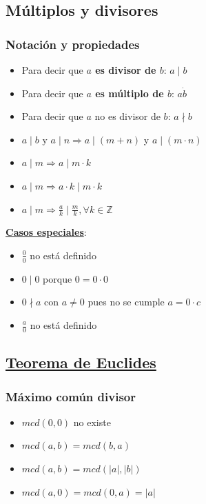 \documentclass[10pt,a4paper,openright]{book}
\begin{document}
\subsection*{Múltiplos y divisores}
\subsubsection*{Notación y propiedades}
\begin{itemize}
\item Para decir que \textbf{$a$ es divisor de $b$}: $a\mid b$
\item Para decir que \textbf{$a$ es múltiplo de $b$}: $a\dot{b}$
\item Para decir que $a$ no es divisor de $b$: $a\nmid b$
\item $a\mid b$ y $a\mid n\Rightarrow a\mid (m+n)$ y $a\mid (m\cdot n)$
\item $a\mid m\Rightarrow a\mid m\cdot k$
\item $a\mid m\Rightarrow a\cdot k\mid m\cdot k$
\item $a\mid m\Rightarrow \frac{a}{k}\mid \frac{m}{k}, \forall k\in \mathbb Z$
\end{itemize}
\textbf{\underline{Casos especiales}}:
\begin{itemize}
\item $\frac{0}{0}$ no está definido
\item $0\mid 0$ porque $0=0\cdot 0$
\item $0\nmid a$ con $a\neq 0$ pues no se cumple $a=0\cdot c$
\item $\frac{a}{0}$ no está definido
\end{itemize}

\subsection*{\underline{Teorema de Euclides}}
\subsubsection*{Máximo común divisor}
\begin{itemize}
\item $mcd(0,0)$ no existe
\item $mcd(a,b)=mcd(b,a)$
\item $mcd(a,b)=mcd(|a|,|b|)$
\item $mcd(a,0)=mcd(0,a)=|a|$
\end{itemize}
\end{document}
